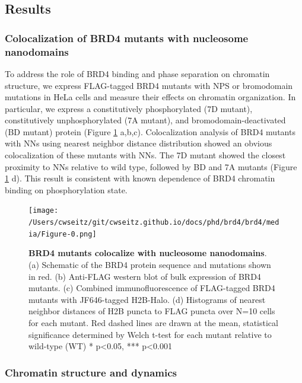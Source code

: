 \subsection{Results}

\subsubsection{Colocalization of BRD4 mutants with nucleosome nanodomains}

To address the role of BRD4 binding and phase separation on chromatin structure, we express FLAG-tagged BRD4 mutants with NPS or bromodomain mutations in HeLa cells and measure their effects on chromatin organization. In particular, we express a constitutively phosphorylated (7D mutant), constitutively unphosphorylated (7A mutant), and bromodomain-deactivated (BD mutant) protein (Figure \ref{fig:fig23} a,b,c). Colocalization analysis of BRD4 mutants with NNs using nearest neighbor distance distribution showed an obvious colocalization of these mutants with NNs. The 7D mutant showed the closest proximity to NNs relative to wild type, followed by BD and 7A mutants (Figure \ref{fig:fig23} d).  This result is consistent with known dependence of BRD4 chromatin binding on phosphorylation state. 

\begin{figure}[t]
\texttt{[image: /Users/cwseitz/git/cwseitz.github.io/docs/phd/brd4/brd4/media/Figure-0.png]}
\caption{\textbf{BRD4 mutants colocalize with nucleosome nanodomains}. (a) Schematic of the BRD4 protein sequence and mutations shown in red. (b) Anti-FLAG western blot of bulk expression of BRD4 mutants. (c) Combined immunofluorescence of FLAG-tagged BRD4 mutants with JF646-tagged H2B-Halo. (d) Histograms of nearest neighbor distances of H2B puncta to FLAG puncta over N=10 cells for each mutant. Red dashed lines are drawn at the mean, statistical significance determined by Welch t-test for each mutant relative to wild-type (WT) * p<0.05, *** p<0.001}
\label{fig:fig23}
\end{figure}
	
\subsubsection{Chromatin structure and dynamics}

